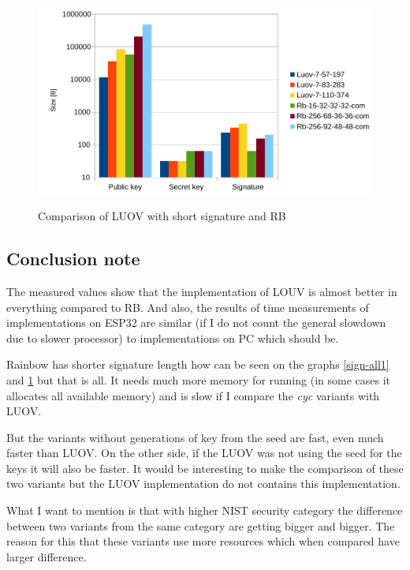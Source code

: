 \documentclass[thesis=M,english]{FITthesis}[2019/12/23]
\begin{document}
\bigskip\bigskip\bigskip
\begin{figure}[H]
\centering
\includegraphics[width=13cm,height=7cm]{images/mem-sign-all2.pdf}
\caption{Comparison of LUOV with short signature and RB}
\label{sign-all2}
\end{figure}

\newpage
\subsection{Conclusion note}
The measured values show that the implementation of LOUV is almost better in everything compared to RB. And also, the results of time measurements of implementations on ESP32 are similar (if I do not count the general slowdown due to slower processor) to implementations on PC which should be.

\bigskip
\noindent
Rainbow has shorter signature length how can be seen on the graphs \ref{sign-all1} and \ref{sign-all2} but that is all. It needs much more memory for running (in some cases it allocates all available memory) and is slow if I compare the \textit{cyc} variants with LUOV.

\bigskip
\noindent
But the variants without generations of key from the seed are fast, even much faster than LUOV. On the other side, if the LUOV was not using the seed for the keys it will also be faster. It would be interesting to make the comparison of these two variants but the LUOV implementation do not contains this implementation.

\bigskip
\noindent
What I want to mention is that with higher NIST security category the difference between two variants from the same category are getting bigger and bigger. The reason for this that these variants use more resources which when compared have larger difference. 

\newpage
\end{document}
